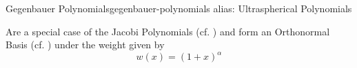 \begin{definition}{Gegenbauer Polynomials}{gegenbauer-polynomials}
  \hypertarget{alias-ultraspherical-polynomials}
  {alias: Ultraspherical Polynomials}

  Are a special case of the Jacobi Polynomials (cf. ) and form an
  Orthonormal Basis (cf. ) under the weight given by
  \[w(x)=(1+x)^\alpha\]
\end{definition}

